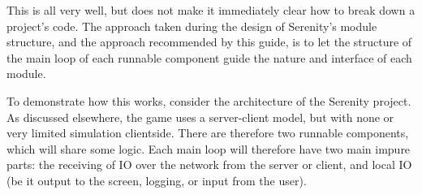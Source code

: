 This is all very well, but does not make it immediately clear how to break down a project's code. The approach taken during the design of Serenity's module structure, and the approach recommended by this guide, is to let the structure of the main loop of each runnable component guide the nature and interface of each module.

To demonstrate how this works, consider the architecture of the Serenity project. As discussed elsewhere, the game uses a server-client model, but with none or very limited simulation clientside. There are therefore two runnable components, which will share some logic. Each main loop will therefore have two main impure parts: the receiving of IO over the network from the server or client, and local IO (be it output to the screen, logging, or input from the user).

